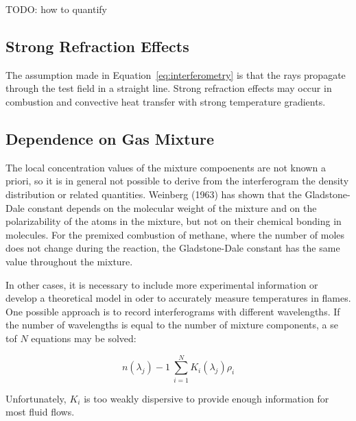 \documentclass[11pt]{article} %
\begin{document}
TODO: how to quantify

\subsection{Strong Refraction Effects}

The assumption made in Equation~\ref{eq:interferometry} is that the rays propagate through the test field in a straight line. Strong refraction effects may occur in combustion and convective heat transfer with strong temperature gradients.

\subsection{Dependence on Gas Mixture}

The local concentration values of the mixture compoenents are not known a priori, so it is in general not possible to derive from the interferogram the density distribution or related quantities. Weinberg (1963) has shown that the Gladstone-Dale constant depends on the molecular weight of the mixture and on the polarizability of the atoms in the mixture, but not on their chemical bonding in molecules. For the premixed combustion of methane, where the number of moles does not change during the reaction, the Gladstone-Dale constant has the same value throughout the mixture.

In other cases, it is necessary to include more experimental information or develop a theoretical model in oder to accurately measure temperatures in flames. One possible approach is to record interferograms with different wavelengths. If the number of wavelengths is equal to the number of mixture components, a se tof $N$ equations may be solved:

\begin{equation}
	n(\lambda_j) -1 \ \sum_{i=1}^N K_i (\lambda_j) \rho_i
	\label{eq:GDmixture}
\end{equation}

Unfortunately, $K_i$ is too weakly dispersive to provide enough information for most fluid flows.
\end{document}
